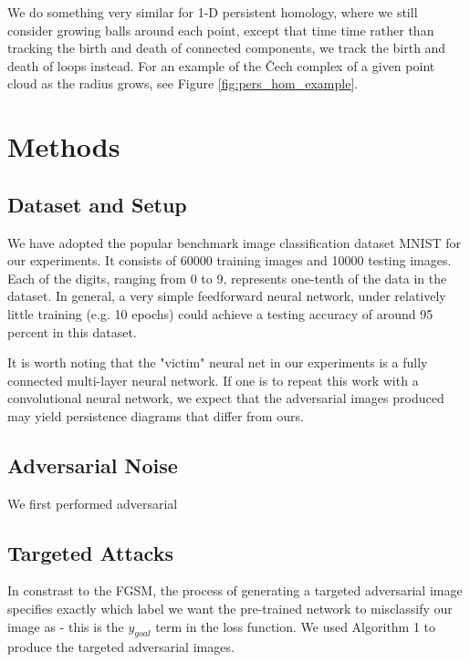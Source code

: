 \documentclass[twoside,twocolumn]{article}
\begin{document}
We do something very similar for 1-D persistent homology, where we still consider growing balls around each point, except that time time rather than tracking the birth and death of connected components, we track the birth and death of loops instead. For an example of the \v Cech complex of a given point cloud as the radius grows, see Figure \ref{fig:pers_hom_example}. 


\section{Methods}

\subsection{Dataset and Setup}
We have adopted the popular benchmark image classification dataset MNIST for our experiments. It consists of 60000 training images and 10000 testing images. Each of the digits, ranging from 0 to 9, represents one-tenth of the data in the dataset. In general, a very simple feedforward neural network, under relatively little training (e.g. 10 epochs) could achieve a testing accuracy of around 95 percent in this dataset. 

It is worth noting that the "victim" neural net in our experiments is a fully connected multi-layer neural network. If one is to repeat this work with a convolutional neural network, we expect that the adversarial images produced may yield persistence diagrams that differ from ours.

\subsection{Adversarial Noise}
We first performed adversarial 


\subsection{Targeted Attacks}

In constrast to the FGSM, the process of generating a targeted adversarial image specifies exactly which label we want the pre-trained network to misclassify our image as - this is the $y_{goal}$ term in the loss function. We used Algorithm 1 to produce the targeted adversarial images.
\end{document}

